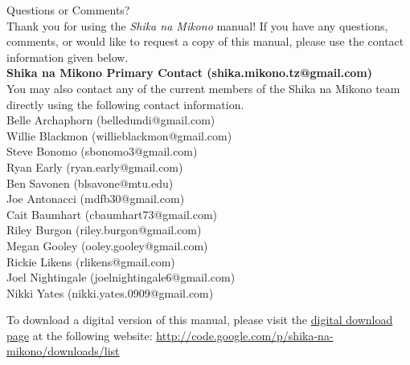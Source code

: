\begin{center}
{\Huge Questions or Comments?}\\[12pt]
Thank you for using the \textit{Shika na Mikono} manual! If you have any questions, comments, or would like to request a copy of this manual, please use the contact information given below.\\[20pt]
\textbf{Shika na Mikono Primary Contact (shika.mikono.tz@gmail.com)}\\[20pt]
You may also contact any of the current members of the Shika na Mikono team directly using the following contact information.\\[20pt]
Belle Archaphorn (belledundi@gmail.com)\\
Willie Blackmon (willieblackmon@gmail.com)\\
Steve Bonomo (sbonomo3@gmail.com)\\
Ryan Early (ryan.early@gmail.com)\\
Ben Savonen (blsavone@mtu.edu)\\
\vspace{6pt}
Joe Antonacci (mdfb30@gmail.com)\\
Cait Baumhart (cbaumhart73@gmail.com)\\
Riley Burgon (riley.burgon@gmail.com)\\
Megan Gooley (ooley.gooley@gmail.com)\\
Rickie Likens (rlikens@gmail.com)\\
Joel Nightingale (joelnightingale6@gmail.com)\\
Nikki Yates (nikki.yates.0909@gmail.com)\\


\end{center}
\vfill
To download a digital version of this manual, please visit the \href{http://code.google.com/p/shika-na-mikono/downloads/list}{digital download page} at the following website: \url{http://code.google.com/p/shika-na-mikono/downloads/list}